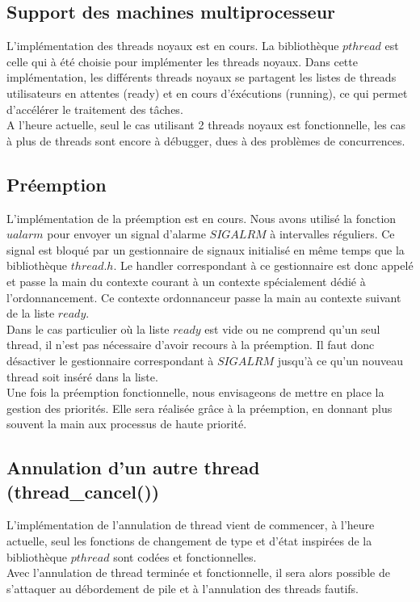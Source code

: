 \subsection{Support des machines multiprocesseur}
L'implémentation des threads noyaux est en cours. La bibliothèque $pthread$ est celle qui à été choisie pour implémenter les threads noyaux. Dans cette implémentation, les différents threads noyaux se partagent les listes de threads utilisateurs en attentes (ready) et en cours d'éxécutions (running), ce qui permet d'accélérer le traitement des tâches.\\
\indent A l'heure actuelle, seul le cas utilisant 2 threads noyaux est fonctionnelle, les cas à plus de threads sont encore à débugger, dues à des problèmes de concurrences.

\subsection{Préemption}
L'implémentation de la préemption est en cours. Nous avons utilisé la fonction $ualarm$ pour envoyer un signal d'alarme $SIGALRM$ à intervalles réguliers. Ce signal est bloqué par un gestionnaire de signaux initialisé en même temps que la bibliothèque $thread.h$. Le handler correspondant à ce gestionnaire est donc appelé et passe la main du contexte courant à un contexte spécialement dédié à l'ordonnancement. Ce contexte ordonnanceur passe la main au contexte suivant de la liste $ready$.\\
\indent Dans le cas particulier où la liste $ready$ est vide ou ne comprend qu'un seul thread, il n'est pas nécessaire d'avoir recours à la préemption. Il faut donc désactiver le gestionnaire correspondant à $SIGALRM$ jusqu'à ce qu'un nouveau thread soit inséré dans la liste.\\
\indent Une fois la préemption fonctionnelle, nous envisageons de mettre en place la gestion des priorités. Elle sera réalisée grâce à la préemption, en donnant plus souvent la main aux processus de haute priorité.
 
\subsection{Annulation d'un autre thread (thread\_cancel())}
L'implémentation de l'annulation de thread vient de commencer, à l'heure actuelle, seul les fonctions de changement de type et d'état inspirées de la bibliothèque $pthread$ sont codées et fonctionnelles.\\
\indent Avec l'annulation de thread terminée et fonctionnelle, il sera alors possible de s'attaquer au débordement de pile et à l'annulation des threads fautifs.
